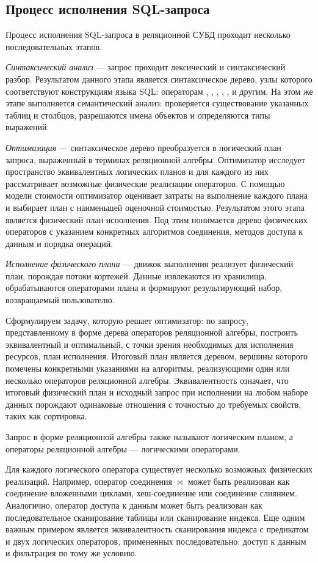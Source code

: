 \documentclass[14pt, russian]{scrartcl}
\begin{document}
\subsection{Процесс исполнения SQL-запроса}

Процесс исполнения SQL-запроса в реляционной СУБД проходит несколько
последовательных этапов.

\emph{Синтаксический анализ} --- запрос проходит лексический и синтаксический
разбор. Результатом данного этапа является синтаксическое дерево, узлы которого
соответствуют конструкциям языка SQL: операторам \SELECT, \FROM, \WHERE, \JOIN,
\GROUPBY, \ORDERBY{} и другим. На этом же этапе выполняется семантический
анализ: проверяется существование указанных таблиц и столбцов, разрешаются имена
объектов и определяются типы выражений.

\emph{Оптимизация} --- синтаксическое дерево преобразуется в логический план
запроса, выраженный в терминах реляционной алгебры. Оптимизатор исследует
пространство эквивалентных логических планов и для каждого из них рассматривает
возможные физические реализации операторов. С помощью модели стоимости
оптимизатор оценивает затраты на выполнение каждого плана и выбирает план с
наименьшей оценочной стоимостью. Результатом этого этапа является физический
план исполнения. Под этим понимается дерево физических операторов с указанием
конкретных алгоритмов соединения, методов доступа к данным и порядка операций.

\emph{Исполнение физического плана} --- движок выполнения реализует физический
план, порождая потоки кортежей. Данные извлекаются из хранилища, обрабатываются
операторами плана и формируют результирующий набор, возвращаемый пользователю.

Сформулируем задачу, которую решает оптимизатор: по запросу, представленному в
форме дерева операторов реляционной алгебры, построить эквивалентный и
оптимальный, с точки зрения необходимых для исполнения ресурсов, план
исполнения. Итоговый план является деревом, вершины которого помечены
конкретными указаниями на алгоритмы, реализующими один или несколько операторов
реляционной алгебры. Эквивалентность означает, что итоговый физический план и
исходный запрос при исполнении на любом наборе данных порождают одинаковые
отношения с точностью до требуемых свойств, таких как сортировка.

Запрос в форме реляционной алгебры также называют логическим планом, а операторы
реляционной алгебры --- логическими операторами.

Для каждого логического оператора существует несколько возможных физических
реализаций. Например, оператор соединения \(\bowtie\) может быть реализован как
соединение вложенными циклами, хеш-соединение или соединение слиянием.
Аналогично, оператор доступа к данным может быть реализован как последовательное
сканирование таблицы или сканирование индекса. Еще одним важным примером
является эквивалентность сканирования индекса с предикатом и двух логических
операторов, примененных последовательно: доступ к данным и фильтрация по тому же
условию.
\end{document}
